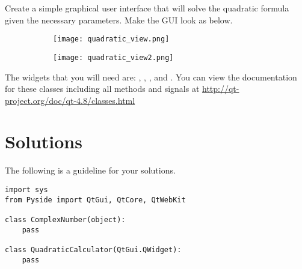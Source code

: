 \begin{problem}
Create a simple graphical user interface that will solve the quadratic formula given the necessary parameters.
Make the GUI look as below.
\begin{figure}[H]
\centering
\begin{subfigure}[b]{.49\textwidth}
\texttt{[image: quadratic\_view.png]}
\end{subfigure}
\begin{subfigure}[b]{.49\textwidth}
\texttt{[image: quadratic\_view2.png]}
\end{subfigure}
\end{figure}
The widgets that you will need are: , , , and .
You can view the documentation for these classes including all methods and signals at \url{http://qt-project.org/doc/qt-4.8/classes.html}
\end{problem}

\section*{Solutions}

The following is a guideline for your solutions.
\begin{lstlisting}
import sys
from Pyside import QtGui, QtCore, QtWebKit

class ComplexNumber(object):
	pass
	
class QuadraticCalculator(QtGui.QWidget):
	pass
\end{lstlisting}

